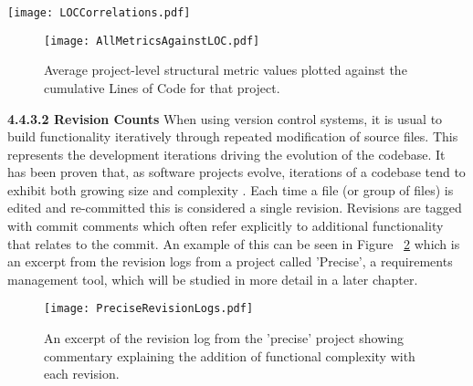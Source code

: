 \begin{table}
\centering 
{}
\begin{tabular}
 \centering 
 \texttt{[image: LOCCorrelations.pdf]}
 \label{tab:LOCCorrelations}
\end{tabular}
\end{table}

\begin{figure}[htbp!] 
\centering    
\texttt{[image: AllMetricsAgainstLOC.pdf]}
\caption{Average project-level structural metric values plotted against the cumulative Lines of Code for that project.}
\label{fig:AllMetricsAgainstLOC}
\end{figure}

\newline
\textbf{4.4.3.2 Revision Counts}
\newline
When using version control systems, it is usual to build functionality iteratively through repeated modification of source files. This represents the development iterations driving the evolution of the codebase. It has been proven that, as software projects evolve, iterations of a codebase tend to exhibit both growing size and complexity \citep{prather1984axiomatic}. Each time a file (or group of files) is edited and re-committed this is considered a single revision. Revisions are tagged with commit comments which often refer explicitly to additional functionality that relates to the commit. An example of this can be seen in Figure ~\ref{fig:PreciseRevisionLogs} which is an excerpt from the revision logs from a project called 'Precise', a requirements management tool, which will be studied in more detail in a later chapter.

\begin{figure}[htbp!] 
\centering    
\texttt{[image: PreciseRevisionLogs.pdf]}
\caption{An excerpt of the revision log from the 'precise' project showing commentary explaining the addition of functional complexity with each revision.}
\label{fig:PreciseRevisionLogs}
\end{figure}


